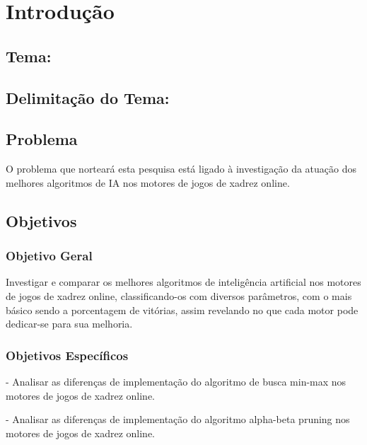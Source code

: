 

\chapter{Introdução}
\section[Tema]{Tema: {}}

\section[Delimitação do Tema]{Delimitação do Tema: {}}
\section{Problema}
O problema que norteará esta pesquisa está ligado à investigação da atuação dos melhores algoritmos de IA nos motores de jogos de xadrez online.
\section{Objetivos}
\subsection{Objetivo Geral}
Investigar e comparar os melhores algoritmos de inteligência artificial nos motores de jogos de xadrez online, classificando-os com diversos parâmetros, com o mais básico sendo a porcentagem de vitórias, assim revelando no que cada motor pode dedicar-se para sua melhoria.
\subsection{Objetivos Específicos}
- Analisar as diferenças de implementação do algoritmo de busca min-max nos motores de jogos de xadrez online.

- Analisar as diferenças de implementação do algoritmo alpha-beta pruning nos motores de jogos de xadrez online.

